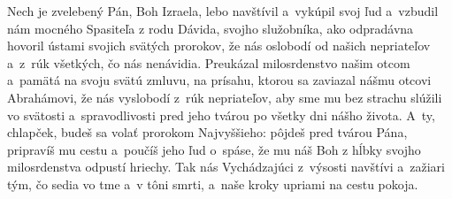 Nech je zvelebený Pán, Boh Izraela,
lebo navštívil a~vykúpil svoj ľud
\versseparator
a~vzbudil nám mocného Spasiteľa
z rodu Dávida, svojho služobníka,
\versseparator
ako odpradávna hovoril
ústami svojich svätých prorokov,
\versseparator
že nás oslobodí od našich nepriateľov
a~z~rúk všetkých, čo nás nenávidia.
\versseparator
Preukázal milosrdenstvo našim otcom
a~pamätá na svoju svätú zmluvu,
\versseparator
na prísahu, ktorou sa zaviazal nášmu otcovi Abrahámovi,
že nás vyslobodí z~rúk nepriateľov,
\versseparator
aby sme mu bez strachu slúžili
\versseparator
vo svätosti a~spravodlivosti pred jeho tvárou
po všetky dni nášho života.
\versseparator
A~ty, chlapček, budeš sa volať prorokom Najvyššieho:
pôjdeš pred tvárou Pána, pripravíš mu cestu
\versseparator
a~poučíš jeho ľud o~spáse,
\versseparator
že mu náš Boh
z hĺbky svojho milosrdenstva odpustí hriechy.
Tak nás Vychádzajúci z~výsosti navštívi
\versseparator
a~zažiari tým, čo sedia vo tme a~v tôni smrti,
a~naše kroky upriami na cestu pokoja.
